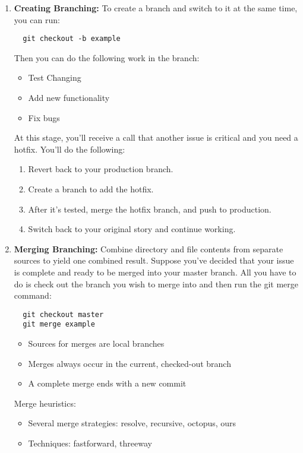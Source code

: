 \documentclass[draftclsnofoot,journal,onecolumn,12pt]{IEEEtran}
\begin{document}
\begin{enumerate}
\item \textbf{Creating Branching:} To create a branch and switch to it at the same time, you can run:
\begin{verbatim}
  git checkout -b example
\end{verbatim}
Then you can do the following work in the branch:
  \begin{itemize}
    \item Test Changing
    \item Add new functionality
    \item Fix bugs
  \end{itemize}
At this stage, you’ll receive a call that another issue is critical and you need a hotfix. You’ll do the following:
\begin{enumerate}
  \item Revert back to your production branch.
  \item Create a branch to add the hotfix.
  \item After it’s tested, merge the hotfix branch, and push to production.
  \item Switch back to your original story and continue working.
\end{enumerate}
\item \textbf{Merging Branching:} Combine directory and file contents from separate sources to yield one combined result. Suppose you’ve decided that your issue is complete and ready to be merged into your master branch. All you have to do is check out the branch you wish to merge into and then run the git merge command:
\begin{verbatim}
  git checkout master
  git merge example
\end{verbatim}

\begin{itemize}
  \item Sources for merges are local branches
  \item Merges always occur in the current, checked-out branch
  \item A complete merge ends with a new commit
\end{itemize}

Merge heuristics:
\begin{itemize}
  \item Several merge strategies: resolve, recursive, octopus, ours
  \item Techniques: fastforward, threeway
\end{itemize}


\end{enumerate}
\end{document}
